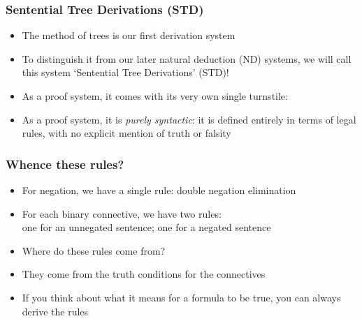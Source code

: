 \begin{frame}
\frametitle{Sentential Tree Derivations (STD)}

\begin{itemize}[<+->]

\item The method of trees is our first derivation system

\item To distinguish it from our later natural deduction (ND) systems, we will call this system `Sentential Tree Derivations' (STD)!

\item As a proof system, it comes with its very own single turnstile: \\ 

\item As a proof system, it is \textit{purely syntactic}: it is defined entirely in terms of legal rules, with no explicit mention of truth or falsity 

\end{itemize}
\end{frame}

\begin{frame}
\frametitle{Whence these rules?}

\begin{itemize}[<+->]

\item For negation, we have a single rule: double negation elimination

\item For each binary connective, we have two rules: \\ one for an unnegated sentence; one for a negated sentence 

\item Where do these rules come from? 

\item They come from the truth conditions for the connectives

\item If you think about what it means for a formula to be true, you can always derive the rules

\end{itemize}
\end{frame}

